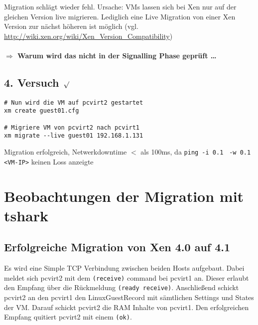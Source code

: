 Migration schlägt wieder fehl. Ursache: VMs lassen sich bei Xen nur auf der gleichen Version live migrieren. Lediglich eine Live Migration von einer Xen Version zur nächst höheren ist möglich (vgl. \url{http://wiki.xen.org/wiki/Xen_Version_Compatibility})
\\
\\
\Large
\textbf{$\Rightarrow$ Warum wird das nicht in der Signalling Phase geprüft  \dots}
\normalsize

\subsection {4. Versuch $\surd$ }
\setupVerbatimOut
\begin{verbatim}
# Nun wird die VM auf pcvirt2 gestartet 
xm create guest01.cfg

# Migriere VM von pcvirt2 nach pcvirt1
xm migrate --live guest01 192.168.1.131
\end{verbatim}

Migration erfolgreich, Netwerkdowntime $<$ als 100ms, da \verb|ping -i 0.1| \verb| -w 0.1 <VM-IP>| keinen Loss anzeigte

\section{Beobachtungen der Migration mit tshark}

\subsection{Erfolgreiche Migration von Xen 4.0 auf 4.1}

Es wird eine Simple TCP Verbindung zwischen beiden Hosts aufgebaut. Dabei meldet sich pcvirt2 mit dem \verb|(receive)| command bei pcvirt1 an. Dieser erlaubt den Empfang über die Rückmeldung \verb|(ready receive)|. Anschließend schickt pcvirt2 an den pcvirt1 den LinuxGuestRecord mit sämtlichen Settings und States der VM. Darauf schickt pcvirt2 die RAM Inhalte von pcvirt1. Den erfolgreichen Empfang quitiert pcvirt2 mit einem \verb|(ok)|.

